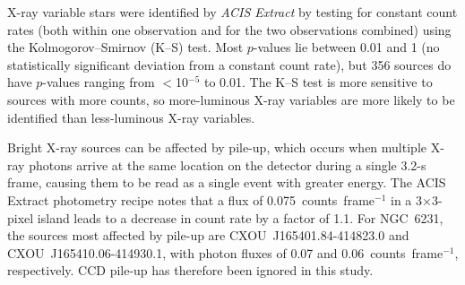 \documentclass[twocolumn,tighten]{aastex61}
\begin{document}
X-ray variable stars were identified by {\it ACIS Extract} by testing for constant count rates (both within one observation and for the two observations combined) using the Kolmogorov--Smirnov (K--S) test. Most $p$-values lie between 0.01 and 1 (no statistically significant deviation from a constant count rate), but 356 sources do have $p$-values ranging from $<$10$^{-5}$ to 0.01. The K--S test is more sensitive to sources with more counts, so more-luminous X-ray variables are more likely to be identified than less-luminous X-ray variables. 

Bright X-ray sources can be affected by pile-up, which occurs when multiple X-ray photons arrive at the same location on the detector during a single 3.2-s frame, causing them to be read as a single event with greater energy. The ACIS Extract photometry recipe notes that a flux of 0.075~counts~frame$^{-1}$ in a 3$\times$3-pixel island leads to a decrease in count rate by a factor of 1.1. For NGC~6231, the sources most affected by pile-up are CXOU~J165401.84-414823.0 and CXOU~J165410.06-414930.1, with photon fluxes of 0.07 and 0.06~counts~frame$^{-1}$, respectively. CCD pile-up has therefore been ignored in this study.
\end{document}
